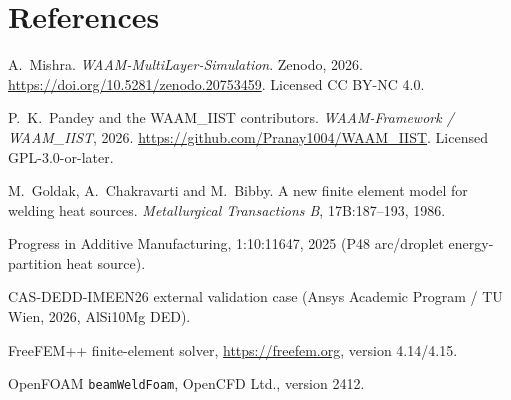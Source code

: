 \documentclass[10pt,a4paper]{article}
\newcommand{\code}[1]{\texttt{#1}}
\begin{document}
\section*{References}
\begin{enumerate}[leftmargin=2.2em,itemsep=0.25em,label={[\arabic*]}]
    \item A.~Mishra. \emph{WAAM-MultiLayer-Simulation}. Zenodo, 2026.
    \url{https://doi.org/10.5281/zenodo.20753459}. Licensed CC BY-NC 4.0.
    \item P.~K.~Pandey and the WAAM\_IIST contributors. \emph{WAAM-Framework /
    WAAM\_IIST}, 2026. \url{https://github.com/Pranay1004/WAAM_IIST}.
    Licensed GPL-3.0-or-later.
    \item M.~Goldak, A.~Chakravarti and M.~Bibby. A new finite element model
    for welding heat sources. \emph{Metallurgical Transactions B},
    17B:187--193, 1986.
    \item Progress in Additive Manufacturing, 1:10:11647, 2025 (P48 arc/droplet
    energy-partition heat source).
    \item CAS-DEDD-IMEEN26 external validation case (Ansys Academic Program /
    TU Wien, 2026, AlSi10Mg DED).
    \item FreeFEM++ finite-element solver, \url{https://freefem.org},
    version 4.14/4.15.
    \item OpenFOAM \code{beamWeldFoam}, OpenCFD Ltd., version 2412.
\end{enumerate}
\end{document}
